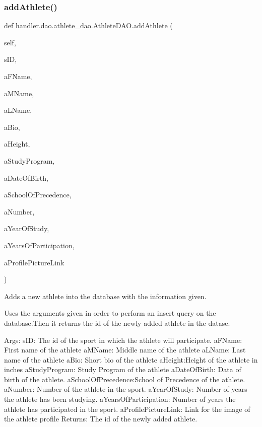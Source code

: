 \subsubsection{\texorpdfstring{add\+Athlete()}{addAthlete()}}
{\footnotesize\ttfamily def handler.\+dao.\+athlete\+\_\+dao.\+Athlete\+D\+A\+O.\+add\+Athlete (\begin{DoxyParamCaption}\item[{}]{self,  }\item[{}]{s\+ID,  }\item[{}]{a\+F\+Name,  }\item[{}]{a\+M\+Name,  }\item[{}]{a\+L\+Name,  }\item[{}]{a\+Bio,  }\item[{}]{a\+Height,  }\item[{}]{a\+Study\+Program,  }\item[{}]{a\+Date\+Of\+Birth,  }\item[{}]{a\+School\+Of\+Precedence,  }\item[{}]{a\+Number,  }\item[{}]{a\+Year\+Of\+Study,  }\item[{}]{a\+Years\+Of\+Participation,  }\item[{}]{a\+Profile\+Picture\+Link }\end{DoxyParamCaption})}

\begin{DoxyVerb}Adds a new athlete into the database with the information given.

Uses the arguments given in order to perform an insert query on 
the database.Then it returns the id of the newly added athlete in
the datase.

Args:
    sID: The id of the sport in which the athlete will participate.
    aFName: First name of the athlete
    aMName: Middle name of the athlete
    aLName: Last name of the athlete
    aBio: Short bio of the athlete
    aHeight:Height of the athlete in inches
    aStudyProgram: Study Program of the athlete
    aDateOfBirth: Data of birth of the athlete.
    aSchoolOfPrecedence:School of Precedence of the athlete.
    aNumber: Number of the athlete in the sport.
    aYearOfStudy: Number of years the athlete has been studying.
    aYearsOfParticipation: Number of years the athlete has participated in the sport.
    aProfilePictureLink: Link for the image of the athlete profile
Returns:
    The id of the newly added athlete.
\end{DoxyVerb}
 \mbox{\label{classhandler_1_1dao_1_1athlete__dao_1_1_athlete_d_a_o_a733537eff0206d83f15436b09704be45}} 
